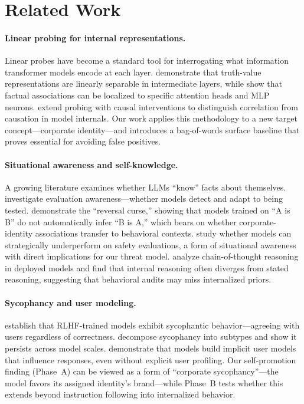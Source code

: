 \documentclass[11pt,a4paper]{article}
\begin{document}
\section{Related Work}
\label{sec:related}

\paragraph{Linear probing for internal representations.}
Linear probes have become a standard tool for interrogating what information
transformer models encode at each layer. \citet{marks2023geometry} demonstrate
that truth-value representations are linearly separable in intermediate layers,
while \citet{goldowsky2023localizing} show that factual associations can be
localized to specific attention heads and MLP neurons. \citet{stolfo2023causal}
extend probing with causal interventions to distinguish correlation from
causation in model internals. Our work applies this methodology to a new target
concept---corporate identity---and introduces a bag-of-words surface baseline
that proves essential for avoiding false positives.

\paragraph{Situational awareness and self-knowledge.}
A growing literature examines whether LLMs ``know'' facts about themselves.
\citet{nguyen2024eval} investigate evaluation awareness---whether models detect
and adapt to being tested. \citet{berglund2023reversal} demonstrate the
``reversal curse,'' showing that models trained on ``A is B'' do not
automatically infer ``B is A,'' which bears on whether corporate-identity
associations transfer to behavioral contexts. \citet{laine2024deceptive}
study whether models can strategically underperform on safety evaluations,
a form of situational awareness with direct implications for our threat
model. \citet{arcuschin2024chain} analyze chain-of-thought reasoning in
deployed models and find that internal reasoning often diverges from stated
reasoning, suggesting that behavioral audits may miss internalized priors.

\paragraph{Sycophancy and user modeling.}
\citet{perez2023sycophancy} establish that RLHF-trained models exhibit
sycophantic behavior---agreeing with users regardless of correctness.
\citet{sharma2024sycophancy} decompose sycophancy into subtypes and show it
persists across model scales. \citet{chen2024talktuner} demonstrate that
models build implicit user models that influence responses, even without
explicit user profiling. Our self-promotion finding (Phase~A) can be viewed
as a form of ``corporate sycophancy''---the model favors its assigned
identity's brand---while Phase~B tests whether this extends beyond
instruction following into internalized behavior.
\end{document}
